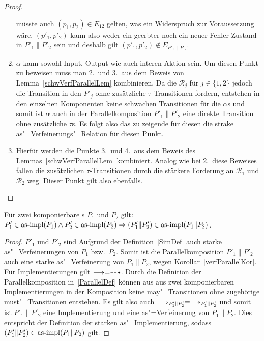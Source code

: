\begin{proof}
\begin{enumerate}
      müsste auch $(p_1,p_2)\in E_{12}$ gelten, was ein Widerspruch zur
      Voraussetzung wäre. $(p'_1,p'_2)$ kann also weder ein geerbter noch ein
      neuer Fehler-Zustand in $P'_1\|P'_2$ sein und deshalb gilt
      $(p'_1,p'_2)\notin E_{P'_1\|P'_2}$.
    \item $\alpha$ kann sowohl Input, Output wie auch interen Aktion sein. Um
      diesen Punkt zu beweisen muss man 2.\ und 3.\ aus dem Beweis von
      Lemma~\ref{schwVerfParallelLem} kombinieren. Da die $\mathcal{R}_j$ für
      $j\in\{1,2\}$ jedoch die Transition in den $P'_j$ ohne zusätzliche
      $\tau$-Transitionen fordern, entstehen in den einzelnen Komponenten keine
      schwachen Transitionen für die $\alpha$s und somit ist $\alpha$ auch in
      der Parallelkomposition $P'_1\|P'_2$ eine direkte Transition ohne
      zusätzliche $\tau$s. Es folgt also das zu zeigende für diesen die strake
      as"=Verfeinerungs"=Relation für diesen Punkt.
    \item Hierfür werden die Punkte 3.\ und 4.\ aus dem Beweis des
      Lemmas~\ref{schwVerfParallelLem} kombiniert. Analog wie bei 2.\ diese
      Beweises fallen die zusätzlichen $\tau$-Transitionen durch die stärkere
      Forderung an $\mathcal{R}_1$ und $\mathcal{R}_2$ weg. Dieser Punkt gilt
      also ebenfalls.
  \end{enumerate}
\end{proof}

\begin{Kor}
  Für zwei komponierbare \MEIO{}s $P_1$ und $P_2$ gilt:
  $P'_1\in\mathrm{as}\text{-}\mathrm{impl} (P_1) \land P'_2 \in\mathrm{as}\text{-}\mathrm{impl} (P_2) \Rightarrow (P'_1\|P'_2)
  \in\mathrm{as}\text{-}\mathrm{impl} (P_1\|P_2)$.
\end{Kor}
\begin{proof}
  $P'_1$ und $P'_2$ sind Aufgrund der Definition~\ref{SimDef} auch starke
  as"=Verfeinerungen von $P_1$ bzw.\ $P_2$. Somit ist die Parallelkomposition
  $P'_1\|P'_2$ auch eine starke as"=Verfeinerung von $P_1\|P_2$, wegen
  Korollar~\ref{verfParallelKor}. Für Implementierungen gilt $\must =\may$.
  Durch die Definition der Parallelkomposition in~\ref{ParallelDef} können aus
  aus zwei komponierbaren Implementierungen in der Komposition keine
  may"=Transitionen ohne zugehörige must"=Transitionen entstehen. Es gilt also
  auch $\must _{P'_1\|P'_2} =\may _{P'_1\|P'_2}$ und somit ist $P'_1\|P'_2$
  eine Implementierung und eine as"=Verfeinerung von $P_1\|P_2$. Dies
  entspricht der Definition der starken as"=Implementierung, sodass
  $(P'_1\|P'_2)\in\mathrm{as}\text{-}\mathrm{impl} (P_1\|P_2)$ gilt.
\end{proof}

